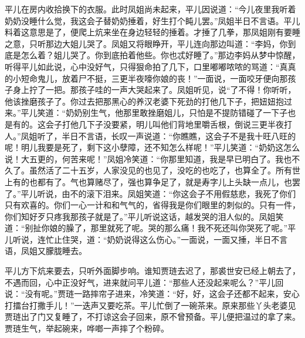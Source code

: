 \begin{parag}
    平儿在房内收拾换下的衣服。此时凤姐尚未起来，平儿因说道：“今儿夜里我听着奶奶没睡什么觉，我这会子替奶奶捶着，好生打个盹儿罢。”凤姐半日不言语。平儿料着这意思是了，便爬上炕来坐在身边轻轻的捶着。才捶了几拳，那凤姐刚有要睡之意，只听那边大姐儿哭了。凤姐又将眼睁开，平儿连向那边叫道：“李妈，你到底是怎么着？姐儿哭了。你到底拍着他些。你也忒好睡了。”那边李妈从梦中惊醒，听得平儿如此说，心中没好气，只得狠命拍了几下，口里嘟嘟哝哝的骂道：“真真的小短命鬼儿，放着尸不挺，三更半夜嚎你娘的丧！”一面说，一面咬牙便向那孩子身上拧了一把。那孩子哇的一声大哭起来了。凤姐听见，说“了不得！你听听，他该挫磨孩子了。你过去把那黑心的养汉老婆下死劲的打他几下子，把妞妞抱过来。”平儿笑道：“奶奶别生气，他那里敢挫磨姐儿，只怕是不提防错碰了一下子也是有的。这会子打他几下子没要紧，明儿叫他们背地里嚼舌根，倒说三更半夜打人。”凤姐听了，半日不言语，长叹一声说道：“你瞧瞧，这会子不是我十旺八旺的呢！明儿我要是死了，剩下这小孽障，还不知怎么样呢！”平儿笑道：“奶奶这怎么说！大五更的，何苦来呢！”凤姐冷笑道：“你那里知道，我是早已明白了。我也不久了。虽然活了二十五岁，人家没见的也见了，没吃的也吃了，也算全了。所有世上有的也都有了。气也算赌尽了，强也算争足了，就是寿字儿上头缺一点儿，也罢了。”平儿听说，由不的滚下泪来。凤姐笑道：“你这会子不用假慈悲，我死了你们只有欢喜的。你们一心一计和和气气的，省得我是你们眼里的刺似的。只有一件，你们知好歹只疼我那孩子就是了。”平儿听说这话，越发哭的泪人似的。凤姐笑道：“别扯你娘的臊了，那里就死了呢。哭的那么痛！我不死还叫你哭死了呢。”平儿听说，连忙止住哭，道：“奶奶说得这么伤心。”一面说，一面又捶，半日不言语，凤姐又朦胧睡去。
\end{parag}


\begin{parag}
    平儿方下炕来要去，只听外面脚步响。谁知贾琏去迟了，那裘世安已经上朝去了，不遇而回，心中正没好气，进来就问平儿道：“那些人还没起来呢么？”平儿回说：“没有呢。”贾琏一路摔帘子进来，冷笑道：“好，好，这会子还都不起来，安心打擂台打撒手儿！”一迭声又要吃茶。平儿忙倒了一碗茶来。原来那些丫头老婆见贾琏出了门又复睡了，不打谅这会子回来，原不曾预备。平儿便把温过的拿了来。贾琏生气，举起碗来，哗啷一声摔了个粉碎。
\end{parag}


